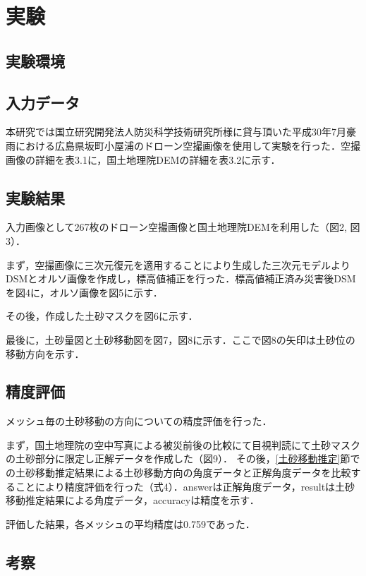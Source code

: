 \chapter{実験}
  \section{実験環境}

  \section{入力データ}
    本研究では国立研究開発法人防災科学技術研究所様に貸与頂いた平成30年7月豪雨における広島県坂町小屋浦のドローン空撮画像\cite{使用データ2}を使用して実験を行った．空撮画像の詳細を表3.1に，国土地理院DEMの詳細を表3.2に示す．

  \section{実験結果}
    入力画像として267枚のドローン空撮画像と国土地理院DEMを利用した（図2, 図3）．
  
    まず，空撮画像に三次元復元を適用することにより生成した三次元モデルよりDSMとオルソ画像を作成し，標高値補正を行った．標高値補正済み災害後DSMを図4に，オルソ画像を図5に示す．
  
    その後，作成した土砂マスクを図6に示す．
  
    最後に，土砂量図と土砂移動図を図7，図8に示す．ここで図8の矢印は土砂位の移動方向を示す．
  
  
  \section{精度評価}
    メッシュ毎の土砂移動の方向についての精度評価を行った．

    まず，国土地理院の空中写真による被災前後の比較\cite{使用データ3}にて目視判読にて土砂マスクの土砂部分に限定し正解データを作成した（図9）． その後，\ref{土砂移動推定}節での土砂移動推定結果による土砂移動方向の角度データと正解角度データを比較することにより精度評価を行った（式4）．answerは正解角度データ，resultは土砂移動推定結果による角度データ，accuracyは精度を示す．


    評価した結果，各メッシュの平均精度は0.759であった．


  \section{考察}
